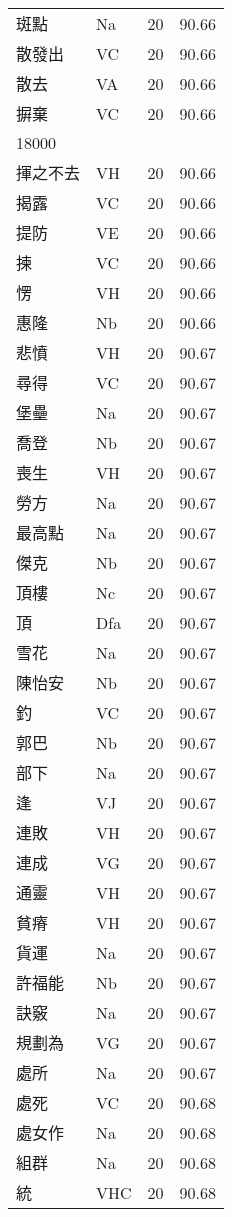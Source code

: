 \documentclass[twocolumn]{book}
\begin{document}
\begin{supertabular}{llrr}
斑點 & Na & 20 &  90.66\\
散發出 & VC & 20 &  90.66\\
散去 & VA & 20 &  90.66\\
摒棄 & VC & 20 &  90.66\\
18000\\
揮之不去 & VH & 20 &  90.66\\
揭露 & VC & 20 &  90.66\\
提防 & VE & 20 &  90.66\\
揀 & VC & 20 &  90.66\\
愣 & VH & 20 &  90.66\\
惠隆 & Nb & 20 &  90.66\\
悲憤 & VH & 20 &  90.67\\
尋得 & VC & 20 &  90.67\\
堡壘 & Na & 20 &  90.67\\
喬登 & Nb & 20 &  90.67\\
喪生 & VH & 20 &  90.67\\
勞方 & Na & 20 &  90.67\\
最高點 & Na & 20 &  90.67\\
傑克 & Nb & 20 &  90.67\\
頂樓 & Nc & 20 &  90.67\\
頂 & Dfa & 20 &  90.67\\
雪花 & Na & 20 &  90.67\\
陳怡安 & Nb & 20 &  90.67\\
釣 & VC & 20 &  90.67\\
郭巴 & Nb & 20 &  90.67\\
部下 & Na & 20 &  90.67\\
逢 & VJ & 20 &  90.67\\
連敗 & VH & 20 &  90.67\\
連成 & VG & 20 &  90.67\\
通靈 & VH & 20 &  90.67\\
貧瘠 & VH & 20 &  90.67\\
貨運 & Na & 20 &  90.67\\
許福能 & Nb & 20 &  90.67\\
訣竅 & Na & 20 &  90.67\\
規劃為 & VG & 20 &  90.67\\
處所 & Na & 20 &  90.67\\
處死 & VC & 20 &  90.68\\
處女作 & Na & 20 &  90.68\\
組群 & Na & 20 &  90.68\\
統 & VHC & 20 &  90.68\\

\end{supertabular}
\end{document}
